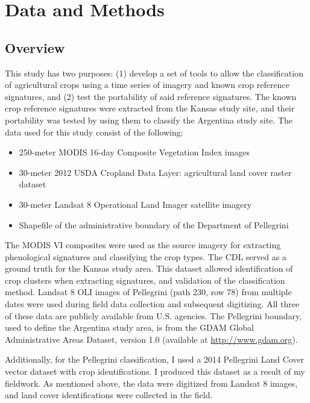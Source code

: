 \chapter{Data and Methods}
\label{methods}

\section{Overview}

This study has two purposes: (1) develop a set of tools to allow the classification of agricultural crops using a time series of imagery and known crop reference signatures, and (2) test the portability of said reference signatures. The known crop reference signatures were extracted from the Kansas study site, and their portability was tested by using them to classify the Argentina study site. The data used for this study consist of the following:

\begin{Spacing}{1.2}
\begin{itemize}
  \item 250-meter MODIS 16-day Composite Vegetation Index images
  \item 30-meter 2012 USDA Cropland Data Layer: agricultural land cover raster dataset
  \item 30-meter Landsat 8 Operational Land Imager satellite imagery
  \item Shapefile of the administrative boundary of the Department of Pellegrini
\end{itemize}
\end{Spacing}

The MODIS VI composites were used as the source imagery for extracting phenological signatures and classifying the crop types. The CDL served as a ground truth for the Kansas study area. This dataset allowed identification of crop clusters when extracting signatures, and validation of the classification method. Landsat 8 OLI images of Pellegrini (path 230, row 78) from multiple dates were used during field data collection and subsequent digitizing. All three of these data are publicly available from U.S. agencies. The Pellegrini boundary, used to define the Argentina study area, is from the GDAM Global Administrative Areas Dataset, version 1.0 (available at \url{http://www.gdam.org}).

Additionally, for the Pellegrini classification, I used a 2014 Pellegrini Land Cover vector dataset with crop identifications. I produced this dataset as a result of my fieldwork. As mentioned above, the data were digitized from Landsat 8 images, and land cover identifications were collected in the field.

